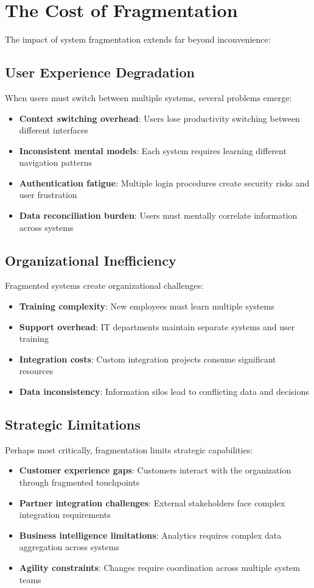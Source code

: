 \section{The Cost of Fragmentation}
\label{sec:cost-fragmentation}

The impact of system fragmentation extends far beyond inconvenience:

\subsection{User Experience Degradation}
When users must switch between multiple systems, several problems emerge:
\begin{itemize}
\item \textbf{Context switching overhead}: Users lose productivity switching between different interfaces
\item \textbf{Inconsistent mental models}: Each system requires learning different navigation patterns
\item \textbf{Authentication fatigue}: Multiple login procedures create security risks and user frustration
\item \textbf{Data reconciliation burden}: Users must mentally correlate information across systems
\end{itemize}

\subsection{Organizational Inefficiency}
Fragmented systems create organizational challenges:
\begin{itemize}
\item \textbf{Training complexity}: New employees must learn multiple systems
\item \textbf{Support overhead}: IT departments maintain separate systems and user training
\item \textbf{Integration costs}: Custom integration projects consume significant resources
\item \textbf{Data inconsistency}: Information silos lead to conflicting data and decisions
\end{itemize}

\subsection{Strategic Limitations}
Perhaps most critically, fragmentation limits strategic capabilities:
\begin{itemize}
\item \textbf{Customer experience gaps}: Customers interact with the organization through fragmented touchpoints
\item \textbf{Partner integration challenges}: External stakeholders face complex integration requirements
\item \textbf{Business intelligence limitations}: Analytics requires complex data aggregation across systems
\item \textbf{Agility constraints}: Changes require coordination across multiple system teams
\end{itemize}

